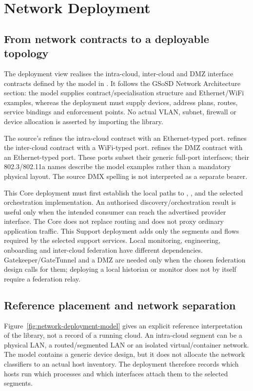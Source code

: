 \section{Network Deployment}
\label{sec:network-deployment}
\subsection{From network contracts to a deployable topology}
The deployment view realises the intra-cloud, inter-cloud and DMZ interface contracts defined by the  model in  \cite{arrowhead52NetworkModel20261110}. It follows the GSoSD Network Architecture section: the model supplies contract/specialisation structure and Ethernet/WiFi examples, whereas the deployment must supply devices, address plans, routes, service bindings and enforcement points. No actual VLAN, subnet, firewall or device allocation is asserted by importing the library.

The source's  refines the intra-cloud contract with an Ethernet-typed port.  refines the inter-cloud contract with a WiFi-typed port.  refines the DMZ contract with an Ethernet-typed port. These ports subset their generic full-port interfaces; their 802.3/802.11a names describe the model examples rather than a mandatory physical layout. The source DMX spelling is not interpreted as a separate bearer.

\ifdefined\ArrowheadCoreNetworkDeployment
This Core deployment must first establish the local paths to , ,  and the selected orchestration implementation. An authorised discovery/orchestration result is useful only when the intended consumer can reach the advertised provider interface. The Core does not replace routing and does not proxy ordinary application traffic.
\else
This Support deployment adds only the segments and flows required by the selected support services. Local monitoring, engineering, onboarding and inter-cloud federation have different dependencies. Gatekeeper/GateTunnel and a DMZ are needed only when the chosen federation design calls for them; deploying a local historian or monitor does not by itself require a federation relay.
\fi

\subsection{Reference placement and network separation}
Figure~\ref{fig:network-deployment-model} gives an explicit reference interpretation of the library, not a record of a running cloud. An intra-cloud segment can be a physical LAN, a routed/segmented LAN or an isolated virtual/container network. The  model contains a generic device design, but it does not allocate the network classifiers to an actual host inventory. The deployment therefore records which hosts run which processes and which interfaces attach them to the selected segments.

